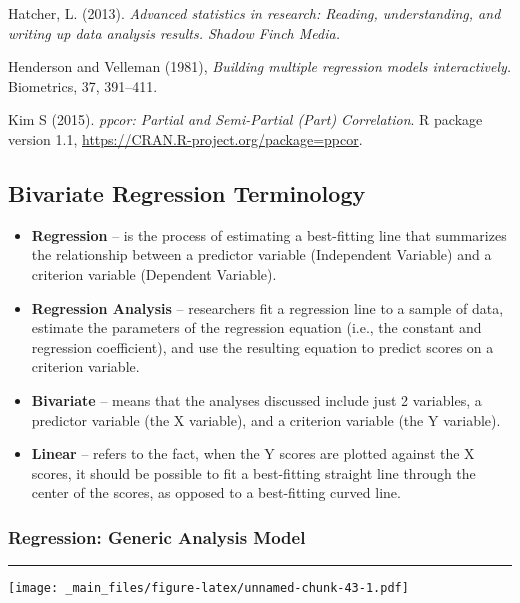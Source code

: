 \documentclass[
]{book}
\theoremstyle{definition}
\theoremstyle{definition}
\theoremstyle{definition}
\theoremstyle{definition}
\theoremstyle{remark}
\begin{document}
Hatcher, L. (2013). \emph{Advanced statistics in research: Reading, understanding, and writing up data analysis results. Shadow Finch Media.}

Henderson and Velleman (1981), \emph{Building multiple regression models interactively.} Biometrics, 37, 391--411.

Kim S (2015). \emph{ppcor: Partial and Semi-Partial (Part) Correlation}. R package version 1.1, \url{https://CRAN.R-project.org/package=ppcor}.

\hypertarget{bivariate-regression-terminology}{%
\subsection{Bivariate Regression Terminology}\label{bivariate-regression-terminology}}

\begin{itemize}
\item
  \textbf{Regression} -- is the process of estimating a best-fitting line that summarizes the relationship between a predictor variable (Independent Variable) and a criterion variable (Dependent Variable).
\item
  \textbf{Regression Analysis} -- researchers fit a regression line to a sample of data, estimate the parameters of the regression equation (i.e., the constant and regression coefficient), and use the resulting equation to predict scores on a criterion variable.
\item
  \textbf{Bivariate} -- means that the analyses discussed include just 2 variables, a predictor variable (the X variable), and a criterion variable (the Y variable).
\item
  \textbf{Linear} -- refers to the fact, when the Y scores are plotted against the X scores, it should be possible to fit a best-fitting straight line through the center of the scores, as opposed to a best-fitting curved line.
\end{itemize}

\hypertarget{regression-generic-analysis-model}{%
\subsubsection{Regression: Generic Analysis Model}\label{regression-generic-analysis-model}}

\begin{center}\rule{0.5\linewidth}{0.5pt}\end{center}

\texttt{[image: \_main\_files/figure-latex/unnamed-chunk-43-1.pdf]}
\end{document}
